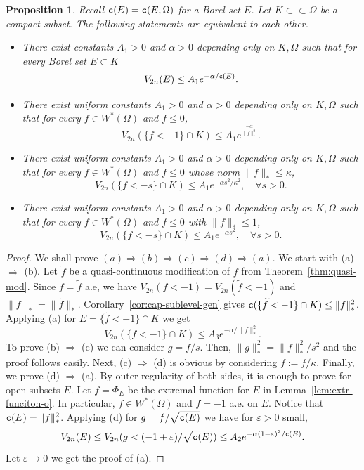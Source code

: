\documentclass{amsart}
\newcommand{\wt}[1]{\widetilde{#1}}
\newcommand{\veps}{\varepsilon}
\newcommand{\al}{\alpha}
\newcommand{\ka}{\kappa}
\newcommand{\tc}{{\tt c}}
\newcommand{\Om}{\Omega}
\newtheorem{prop}[thm]{Proposition}
\theoremstyle{definition}
\numberwithin{thm}{section}
\numberwithin{equation}{section}
\renewcommand{\[}{\begin{equation}}
\renewcommand{\]}{\end{equation}}
\begin{document}
\begin{prop} \label{prop:equiv-est}  Recall  $\tc(E)=\tc(E,\Om)$ for a Borel set $E$.
Let $K\subset\subset \Om$ be a compact subset.  The following statements  are equivalent to each other.
\begin{itemize}
\item[(a)] 
There exist constants $A_1>0$ and $\al>0$ depending only on $K, \Om$ such that for every  Borel  set $E\subset K$ $$V_{2n}(E) \leq A_1 e^{-\al/\tc (E)}.$$

\item[(b)] There exist uniform constants $A_1>0$ and $\al>0$ depending only on $K, \Om$ such that for every  $f\in W^*(\Om)$ and $f\leq 0$,
 $$V_{2n}(\{f< -1\} \cap K) \leq A_1 e^{\frac{-\al}{\|f\|_*^{2}}}.$$
\item
[(c)]   There exist uniform constants $A_1>0$ and $\al>0$ depending only on $K, \Om$ such that for every $f\in W^*(\Om)$ and $f\leq 0$ whose norm $\|f\|_* \leq 
\ka$,
$$V_{2n} (\{f < -s\} \cap K) \leq A_1 e^{-\al s^2/\ka^2}, \quad \forall s>0.$$

\item 
[(d)]  There exist uniform constants $A_1>0$ and $\al>0$ depending only on $K, \Om$ such that for every $f\in W^*(\Om)$ and $f\leq 0$ with $\|f\|_* \leq 1$,
$$V_{2n} (\{f < -s\} \cap K) \leq A_1 e^{-\al s^2}, \quad \forall s>0.$$
\end{itemize}
\end{prop}

\begin{proof} We shall prove 
$(a) \Rightarrow (b) \Rightarrow (c) \Rightarrow (d) \Rightarrow (a).$
We start with (a) $\Rightarrow$ (b). Let $\wt f$ be a quasi-continuous modification of $f$ from Theorem~\ref{thm:quasi-mod}.  Since $f = \wt f$ a.e, we have $V_{2n}(f<-1) = V_{2n}(\wt f<-1)$ and $\|f\|_* = \| \wt f\|_*$.  
Corollary~\ref{cor:cap-sublevel-gen} gives  $\tc (\{\wt f<-1\} \cap K) \leq \|f\|_*^2$. Applying (a) for $E = \{\wt f<-1\} \cap K $ we get
$$
	V_{2n} (\{f<-1\} \cap K) \leq A_3 e^{-\al/\|f\|_*^2}.
$$
To prove (b) $\Rightarrow$ (c) we can consider $g= f/s$. Then, $\|g\|_*^2 = \|f\|_*^2/s^2$ and the proof follows easily. Next, (c) $\Rightarrow$ (d) is obvious by considering $f:= f/\ka$. Finally, we  prove (d) $\Rightarrow$ (a). By outer regularity of both sides, it is enough to prove for open subsets $E$.  Let $f=\Phi_E$ be the extremal function for $E$ in Lemma~\ref{lem:extr-funciton-o}. In particular, $f\in W^*(\Om)$ and $f= -1$ a.e. on $E$. Notice that $\tc (E) = \|f\|_*^2$. Applying (d) for $g = f / \sqrt{\tc (E)}$ we have for $\veps>0$ small,
$$
	V_{2n}(E) \leq V_{2n} (g< (-1+\veps)/\sqrt{\tc (E)})  \leq A_2 e^{-\al (1-\veps)^2/\tc(E)}.
$$
Let $\veps\to 0$ we get the proof of (a). 
\end{proof}
\end{document}
